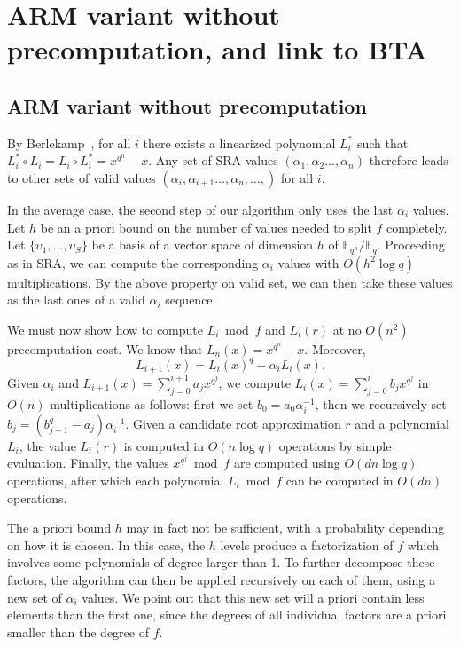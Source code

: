 \documentclass{sig-alternate}
\newcommand{\ff}[1]{\mathbb{F}_{#1}}
\newcommand{\fq}{\ff{q}}
\newcommand{\fqn}{\ff{q^n}}
\newcommand{\qq}{q}
\newcounter{algo}
\begin{document}
\section{ARM variant without precomputation, and link to BTA}





\subsection{ARM variant without precomputation}

By Berlekamp~\cite[Theorem..]{}, for all $i$ there exists a linearized polynomial $L_i^*$ such that $L_i^*\circ L_i=L_i\circ L_i^*=x^{q^n}-x$. Any set of SRA values $(\alpha_{1},\alpha_2\ldots,\alpha_{n})$ therefore leads to other sets of valid values $(\alpha_{i},\alpha_{i+1}\ldots,\alpha_{n},\ldots,)$ for all $i$.

In the average case, the second step of our algorithm only uses the last $\alpha_i$ values. Let $h$ be an a priori bound on the number of values needed to split $f$ completely. Let $\{\upsilon_1,\ldots,\upsilon_S\}$ be a basis of a vector space of dimension $h$ of $\fqn/\fq$. Proceeding as in SRA, we can compute the corresponding $\alpha_i$ values with $O(h^2\log\qq)$ multiplications. By the above property on valid set, we can then take these values as the last ones of a valid $\alpha_i$ sequence.

We must now show how to compute $L_i\bmod f$ and $L_i(r)$ at no $O(n^2)$ precomputation cost. We know that $L_n(x)=x^{q^n}-x$. Moreover,
$$L_{i+1}(x)=L_i(x)^q-\alpha_iL_i(x).$$
Given $\alpha_i$ and $L_{i+1}(x)=\sum_{j=0}^{i+1}a_jx^{q^j}$, we compute $L_i(x)=\sum_{j=0}^{i}b_jx^{q^j}$ in $O(n)$ multiplications as follows: first we set $b_0=a_0\alpha_i^{-1}$, then we recursively set $b_j=(b_{j-1}^q-a_j)\alpha_i^{-1}$.
%
Given a candidate root approximation $r$ and a polynomial $L_i$, the value $L_i(r)$ is computed in $O(n\log q)$ operations by simple evaluation. 
%
Finally, the values $x^{q^j}\bmod f$ are computed using $O(dn\log q)$ operations, after which each polynomial
$L_i\bmod f$ can be computed in $O(dn)$ operations.

The a priori bound $h$ may in fact not be sufficient, with a probability depending on how it is chosen. In this case, the $h$ levels produce a factorization of $f$ which involves some polynomials of degree larger than 1. To further decompose these factors, the algorithm can then be applied recursively on each of them, using a new set of $\alpha_i$ values. We point out that this new set will a priori contain less elements than the first one, since the degrees of all individual factors are a priori smaller than the degree of $f$.
\end{document}
